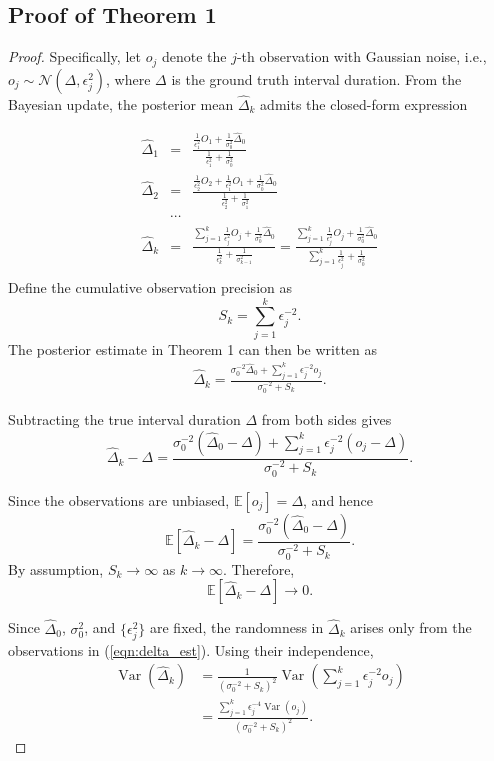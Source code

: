 \documentclass[letterpaper,10pt,onecolumn]{IEEEtran}
\begin{document}
\subsection{Proof of Theorem 1}
\label{supp:proof_theorem1}

\begin{proof}
Specifically, let $o_j$ denote the $j$-th observation with Gaussian noise, i.e., $o_j\sim \mathcal{N}(\Delta, \epsilon_j^2)$, where $\Delta$ is the ground truth interval duration. From the Bayesian update, the posterior mean $\hat\Delta_k$ admits the closed-form expression

\begin{eqnarray*}
    \hat{\Delta}_1 &=& \frac{\frac{1}{\epsilon_1^2} O_1 +\frac{1}{\sigma_0^2}\hat{\Delta}_0 }{\frac{1}{\epsilon_1^2}+\frac{1}{\sigma_0^2}}\\
    \hat{\Delta}_2&=&\frac{\frac{1}{\epsilon_2^2} O_2+\frac{1}{\epsilon_1^2} O_1 +\frac{1}{\sigma_0^2}\hat{\Delta}_0 }{\frac{1}{\epsilon_2^2}+\frac{1}{\sigma_1^2}}\\   &\cdots&\\
\hat{\Delta}_k&=&\frac{\sum_{j=1}^k{\frac{1}{\epsilon_j^2} O_j} +\frac{1}{\sigma_0^2}\hat{\Delta}_0 }{\frac{1}{\epsilon_k^2}+\frac{1}{\sigma_{k-1}^2}}=\frac{\sum_{j=1}^k{\frac{1}{\epsilon_j^2} O_j} +\frac{1}{\sigma_0^2}\hat{\Delta}_0 }{\sum_{j=1}^k{\frac{1}{\epsilon_j^2}}+\frac{1}{\sigma_{0}^2}}\\
\end{eqnarray*}
Define the cumulative observation precision as
\[
S_k = \sum_{j=1}^{k}\epsilon_j^{-2}.
\]
The posterior estimate in Theorem 1 can then be written as
\begin{eqnarray}
\hat{\Delta}_k =
\frac{
\sigma_0^{-2}\hat{\Delta}_0+
\sum_{j=1}^{k}\epsilon_j^{-2}o_j
}{
\sigma_0^{-2}+S_k
}.   \label{eqn:delta_est}
\end{eqnarray}

Subtracting the true interval duration $\Delta$ from both sides gives
\[
\hat{\Delta}_k-\Delta
=
\frac{
\sigma_0^{-2}(\hat{\Delta}_0-\Delta)
+
\sum_{j=1}^{k}\epsilon_j^{-2}(o_j-\Delta)
}{
\sigma_0^{-2}+S_k
}.
\]

Since the observations are unbiased,
$\mathbb{E}[o_j]=\Delta$, and hence
\[
\mathbb{E}[\hat{\Delta}_k-\Delta]
=
\frac{
\sigma_0^{-2}(\hat{\Delta}_0-\Delta)
}{
\sigma_0^{-2}+S_k
}.
\]
By assumption, $S_k\rightarrow\infty$ as $k\rightarrow\infty$.
Therefore,
\[
\mathbb{E}[\hat{\Delta}_k-\Delta]\rightarrow 0.
\]


Since $\hat{\Delta}_0$, $\sigma_0^2$, and $\{\epsilon_j^2\}$ are
fixed, the randomness in $\hat{\Delta}_k$ arises only from the
observations in (\ref{eqn:delta_est}). Using their independence,
\begin{align*}
\operatorname{Var}(\hat{\Delta}_k)
&=
\frac{1}{(\sigma_0^{-2}+S_k)^2}
\operatorname{Var}\left(
\sum_{j=1}^{k}\epsilon_j^{-2}o_j
\right)\\
&=
\frac{
\sum_{j=1}^{k}\epsilon_j^{-4}\operatorname{Var}(o_j)
}{
(\sigma_0^{-2}+S_k)^2
}.
\end{align*}


\end{proof}
\end{document}
